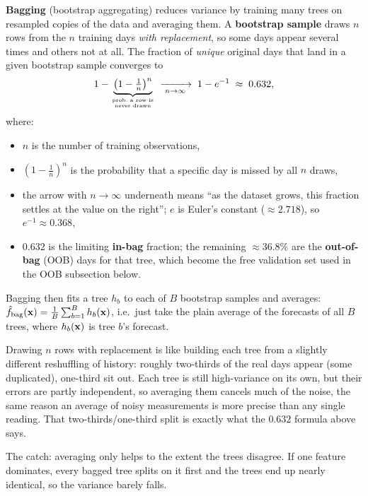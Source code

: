\textbf{Bagging} (bootstrap aggregating) reduces variance by training many
trees on resampled copies of the data and averaging them.  A
\textbf{bootstrap sample} draws $n$ rows from the $n$ training days
\emph{with replacement}, so some days appear several times and others not at
all.  The fraction of \emph{unique} original days that land in a given
bootstrap sample converges to
\begin{equation}\label{eq:trees:bootstrap632}
  1 - \underbrace{\left(1 - \tfrac{1}{n}\right)^{n}}_{\text{prob.\ a row is}\atop\text{never drawn}}
  \;\xrightarrow[\;n\to\infty\;]{}\;
  1 - e^{-1} \;\approx\; 0.632,
\end{equation}
where:
\begin{itemize}[leftmargin=1.8em]
  \item $n$ is the number of training observations,
  \item $(1-\tfrac{1}{n})^n$ is the probability that a specific day is
        missed by all $n$ draws,
  \item the arrow with $n\to\infty$ underneath means ``as the dataset grows,
        this fraction settles at the value on the right''; $e$ is Euler's
        constant ($\approx 2.718$), so $e^{-1}\approx 0.368$,
  \item $0.632$ is the limiting \textbf{in-bag} fraction; the remaining
        $\approx 36.8\%$ are the \textbf{out-of-bag} (OOB) days for that tree,
        which become the free validation set used in the OOB subsection below.
\end{itemize}
Bagging then fits a tree $h_b$ to each of $B$ bootstrap samples and averages:
$\hat{f}_{\text{bag}}(\mathbf{x}) = \tfrac{1}{B}\sum_{b=1}^{B} h_b(\mathbf{x})$, i.e.\ just
take the plain average of the forecasts of all $B$ trees, where $h_b(\mathbf{x})$ is
tree $b$'s forecast.

\begin{intuition}
Drawing $n$ rows with replacement is like building each tree from a slightly
different reshuffling of history: roughly two-thirds of the real days appear
(some duplicated), one-third sit out.  Each tree is still high-variance on
its own, but their errors are partly independent, so averaging them cancels
much of the noise, the same reason an average of noisy measurements is more
precise than any single reading.  That two-thirds/one-third split is exactly
what the $0.632$ formula above says.
\end{intuition}

The catch: averaging only helps to the extent the trees disagree.  If one
feature dominates, every bagged tree splits on it first and the trees end up
nearly identical, so the variance barely falls.

